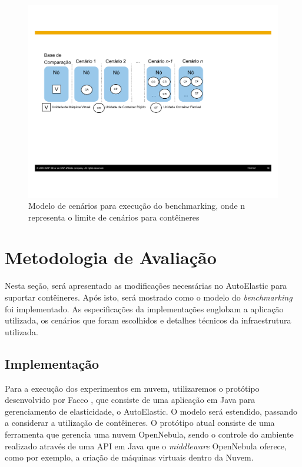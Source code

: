 \documentclass[twoside,english,brazilian]{UNISINOSartigo}
\begin{document}
\begin{figure}[ht!]
	\caption{Modelo de cenários para execução do benchmarking, onde n representa o limite de cenários para contêineres}
	\label{fig:modelo}
	\centering%
	\vspace{-0.75\baselineskip}
	\begin{minipage}{0.7\textwidth}
		\includegraphics[width=\textwidth]{images/cropped_cenarios}
	\end{minipage}
\end{figure}

\section{Metodologia de Avaliação}
Nesta seção, será apresentado as modificações necessárias no AutoElastic para suportar contêineres. Após isto, será mostrado como o modelo do \textit{benchmarking} foi implementado. As especificações da implementações englobam a aplicação utilizada, os cenários que foram escolhidos e detalhes técnicos da infraestrutura utilizada.

\subsection{Implementação}
\label{prototype}

Para a execução dos experimentos em nuvem, utilizaremos o protótipo desenvolvido por Facco , que consiste de uma aplicação em Java para gerenciamento de elasticidade, o AutoElastic. O modelo será estendido, passando a considerar a utilização de contêineres. O protótipo atual consiste de uma ferramenta que gerencia uma nuvem OpenNebula, sendo o controle do ambiente realizado através de uma API em Java que o \textit{middleware} OpenNebula oferece, como por exemplo, a criação de máquinas virtuais dentro da Nuvem. 
\end{document}
